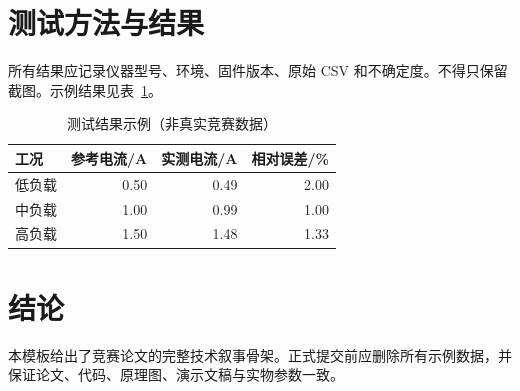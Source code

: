 \documentclass[12pt,fontset=fandol]{ctexart}
\begin{document}
\section{测试方法与结果}
所有结果应记录仪器型号、环境、固件版本、原始 CSV 和不确定度。不得只保留截图。示例结果见表~\ref{tab:results}。

\begin{table}[htbp]
  \centering
  \caption{测试结果示例（非真实竞赛数据）}\label{tab:results}
  \begin{tabular}{lrrr}
    \toprule
    工况 & 参考电流/A & 实测电流/A & 相对误差/\% \\
    \midrule
    低负载 & 0.50 & 0.49 & 2.00 \\
    中负载 & 1.00 & 0.99 & 1.00 \\
    高负载 & 1.50 & 1.48 & 1.33 \\
    \bottomrule
  \end{tabular}
\end{table}

\section{结论}
本模板给出了竞赛论文的完整技术叙事骨架。正式提交前应删除所有示例数据，并保证论文、代码、原理图、演示文稿与实物参数一致。

\printbibliography[heading=bibintoc]
\end{document}
